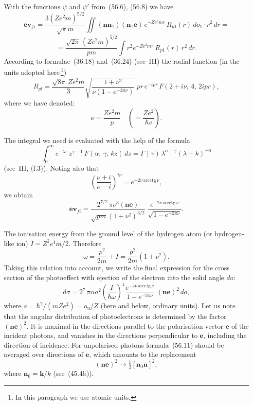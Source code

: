 With the functions $\psi$ and $\psi'$ from~(56.6), (56.8) we have
\[
\mathbf{e}\mathbf{v}_{fi} = \frac{3(Ze^2m)^{5/2}}{\sqrt{\pi}m}\iint(\mathbf{nn}_1)(\mathbf{n}_1\mathbf{e})\,e^{-Ze^2mr}\,R_{p1}(r)\,do_1\cdot r^2\,dr =
\]
\[
= \frac{\sqrt{2\pi}\,(Ze^2m)^{5/2}}{pm}\int r^2 e^{-Ze^2mr}\,R_{p1}(r)\,r^2\,dr.
\]
According to formulae~(36.18) and~(36.24) (see~III) the radial function (in the units adopted here\,\footnote{In this paragraph we use atomic units.})
\[
R_{pl} = \frac{\sqrt{8\pi}\,Ze^2m}{3}\sqrt{\frac{1+\nu^2}{\nu(1-e^{-2\pi\nu})}}\;pr\,e^{-ipr}\,F(2+i\nu,\,4,\,2ipr),
\]
where we have denoted:
\begin{equation}
\nu = \frac{Ze^2m}{p}\quad\left(= \frac{Ze^2}{\hbar v}\right).
\tag{56.9}
\end{equation}

The integral we need is evaluated with the help of the formula
\[
\int_0^\infty e^{-\lambda z}\,z^{\gamma - 1}\,F(\alpha,\,\gamma,\,kz)\,dz = \Gamma(\gamma)\,\lambda^{\alpha - \gamma}(\lambda - k)^{-\alpha}
\]
(see~III, (f.3)). Noting also that
\[
\left(\frac{\nu + i}{\nu - i}\right)^{\!i\nu} = e^{-2\nu\,\mathrm{arcctg}\,\nu},
\]
we obtain
\[
\mathbf{e}\mathbf{v}_{fi} = \frac{2^{7/2}\,\pi\nu^3(\mathbf{ne})}{\sqrt{pm}(1+\nu^2)^{3/2}}\;\frac{e^{-2\nu\,\mathrm{arcctg}\,\nu}}{\sqrt{1-e^{-2\pi\nu}}}.
\]

The ionisation energy from the ground level of the hydrogen atom (or hydrogen-like ion) $I = Z^2e^4m/2$. Therefore
\begin{equation}
\omega = \frac{p^2}{2m} + I = \frac{p^2}{2m}(1+\nu^2).
\tag{56.10}
\end{equation}
Taking this relation into account, we write the final expression for the cross section of the photoeffect with ejection of the electron into the solid angle $do$:
\begin{equation}
d\sigma = 2^7\,\pi\alpha a^2\left(\frac{I}{\hbar\omega}\right)^{\!4}\frac{e^{-4\nu\,\mathrm{arcctg}\,\nu}}{1-e^{-2\pi\nu}}\;(\mathbf{ne})^2\,do,
\tag{56.11}
\end{equation}
where $a = \hbar^2/(mZe^2) = a_0/Z$ (here and below, ordinary units). Let us note that the angular distribution of photoelectrons is determined by the factor $(\mathbf{ne})^2$. It is maximal in the directions parallel to the polarisation vector $\mathbf{e}$ of the incident photons, and vanishes in the directions perpendicular to $\mathbf{e}$, including the direction of incidence. For unpolarised photons formula~(56.11) should be averaged over directions of $\mathbf{e}$, which amounts to the replacement
\[
(\mathbf{ne})^2 \to \tfrac{1}{2}[\mathbf{n}_0\mathbf{n}]^2,
\]
where $\mathbf{n}_0 = \mathbf{k}/k$ (see~(45.4b)).

